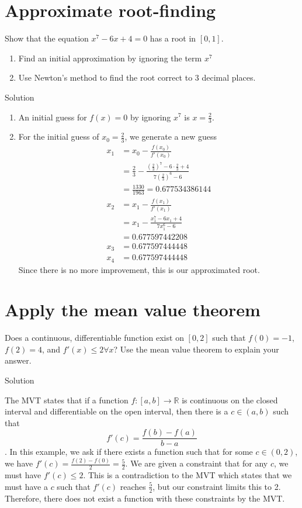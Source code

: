 \documentclass[12pt]{article}
\begin{document}
 \section{Approximate root-finding}
Show that the equation $x^7 -6x+4=0$ has a root in $[0,1]$.
\begin{enumerate}
    \item Find an initial approximation by ignoring the term $x^7$
    \item Use Newton’s method to find the root correct to 3 decimal places.
\end{enumerate}
Solution
\begin{enumerate}
    \item An initial guess for $f(x)=0$ by ignoring $x^7$ is $x=\frac{2}{3}$.
    \item For the initial guess of $x_0=\frac{2}{3}$, we generate a new guess
    \begin{align*}
        x_1 &= x_0 - \frac{f(x_0)}{f'(x_0)}
        \\ &= \frac{2}{3} - \frac{\left(\frac{2}{3}\right)^7 - 6\cdot \frac{2}{3}+4 }{7\left(\frac{2}{3}\right)^6 - 6}
        \\ &= \frac{1330}{1963} =0.677534386144
        \\ x_2 &= x_1- \frac{f(x_1)}{f'(x_1)}
        \\ &= x_1 - \frac{x_1^7 - 6x_1+4 }{7x_1^6 - 6}
        \\ &= 0.677597442208
        \\ x_3 &= 0.677597444448
        \\ x_4 &= 0.677597444448
    \end{align*}
    Since there is no more improvement, this is our approximated root. 
\end{enumerate}

\section{Apply the mean value theorem}
Does a continuous, differentiable function exist on $[0,2]$ such that $f(0) = -1$, $f(2) = 4$, and $f'(x) \leq 2 \forall x$? Use the mean value theorem to explain your answer.

Solution


The MVT states that if a function $f:[a,b] \to \mathbb{R}$ is continuous on the closed interval and differentiable on the open interval, then there is a $c \in (a,b)$ such that \[ f'(c) = \frac{f(b) - f(a)}{b-a}\]. In this example, we ask if there exists a function such that for some $c\in(0,2)$, we have $f'(c) = \frac{f(2)-f(0)}{2}=\frac{5}{2}$. We are given a constraint that for any $c$, we must have $f'(c) \leq 2.$ This is a contradiction to the MVT which states that we must have a $c$ such that $f'(c)$ reaches $\frac{5}{2}$, but our constraint limits this to 2. Therefore, there does not exist a function with these constraints by the MVT. 
\end{document}
